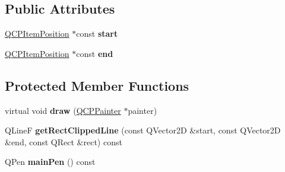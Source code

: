 \subsection*{\-Public \-Attributes}
\begin{DoxyCompactItemize}
\item 
\hypertarget{classQCPItemLine_a602da607a09498b0f152ada1d6851bc5}{\hyperlink{classQCPItemPosition}{\-Q\-C\-P\-Item\-Position} $\ast$const {\bfseries start}}\label{classQCPItemLine_a602da607a09498b0f152ada1d6851bc5}

\item 
\hypertarget{classQCPItemLine_a15598864c1c22a2497a1979c4980c4e1}{\hyperlink{classQCPItemPosition}{\-Q\-C\-P\-Item\-Position} $\ast$const {\bfseries end}}\label{classQCPItemLine_a15598864c1c22a2497a1979c4980c4e1}

\end{DoxyCompactItemize}
\subsection*{\-Protected \-Member \-Functions}
\begin{DoxyCompactItemize}
\item 
\hypertarget{classQCPItemLine_a1fc045dd33919f8006df0692aeb0e84a}{virtual void {\bfseries draw} (\hyperlink{classQCPPainter}{\-Q\-C\-P\-Painter} $\ast$painter)}\label{classQCPItemLine_a1fc045dd33919f8006df0692aeb0e84a}

\item 
\hypertarget{classQCPItemLine_a36e8620019a221ccea4357f0287b81c2}{\-Q\-Line\-F {\bfseries get\-Rect\-Clipped\-Line} (const \-Q\-Vector2\-D \&start, const \-Q\-Vector2\-D \&end, const \-Q\-Rect \&rect) const }\label{classQCPItemLine_a36e8620019a221ccea4357f0287b81c2}

\item 
\hypertarget{classQCPItemLine_a7b5bc4ebacb55774b87c91b308ca7912}{\-Q\-Pen {\bfseries main\-Pen} () const }\label{classQCPItemLine_a7b5bc4ebacb55774b87c91b308ca7912}

\end{DoxyCompactItemize}

